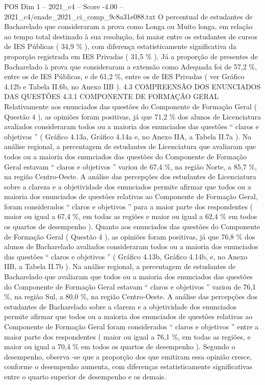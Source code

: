 \begin{textsample}{POS Dim 1 – 2021\_c4 – Score -4.00 – 2021\_c4/enade\_2021\_ci\_comp\_9c8a31e088.txt}
O percentual de estudantes de Bacharelado que consideraram a prova como Longa ou Muito longa, em relação ao tempo total destinado à sua resolução, foi maior entre os estudantes de cursos de IES Públicas ( 34,9 \% ), com diferença estatisticamente significativa da proporção registrada em IES Privadas ( 31,5 \% ).
Já a proporção de presentes de Bacharelado à prova que consideraram a extensão como Adequada foi de 57,2 \%, entre os de IES Públicas, e de 61,2 \%, entre os de IES Privadas ( ver Gráfico 4.12b e Tabela II.6b, no Anexo IIB ). 4.3 COMPREENSÃO DOS ENUNCIADOS DAS QUESTÕES 4.3.1 COMPONENTE DE FORMAÇÃO GERAL Relativamente aos enunciados das questões do Componente de Formação Geral ( Questão 4 ), as opiniões foram positivas, já que 71,2 \% dos alunos de Licenciatura avaliados consideraram todos ou a maioria dos enunciados das questões “ claros e objetivos ” ( Gráfico 4.13a, Gráfico 4.14a e, no Anexo IIA, a Tabela II.7a ).
Na análise regional, a percentagem de estudantes de Licenciatura que avaliaram que todos ou a maioria dos enunciados das questões do Componente de Formação Geral estavam “ claros e objetivos ” variou de 67,4 \%, na região Norte, a 85,7 \%, na região Centro-Oeste.
A análise das percepções dos estudantes de Licenciatura sobre a clareza e a objetividade dos enunciados permite afirmar que todos ou a maioria dos enunciados de questões relativas ao Componente de Formação Geral, foram considerados “ claros e objetivos ” para a maior parte dos respondentes ( maior ou igual a 67,4 \%, em todas as regiões e maior ou igual a 62,4 \% em todos os quartos de desempenho ).
Quanto aos enunciados das questões do Componente de Formação Geral ( Questão 4 ), as opiniões foram positivas, já que 76,8 \% dos alunos de Bacharelado avaliados consideraram todos ou a maioria dos enunciados das questões “ claros e objetivos ” ( Gráfico 4.13b, Gráfico 4.14b, e, no Anexo IIB, a Tabela II.7b ).
Na análise regional, a percentagem de estudantes de Bacharelado que avaliaram que todos ou a maioria dos enunciados das questões do Componente de Formação Geral estavam “ claros e objetivos ” variou de 76,1 \%, na região Sul, a 80,0 \%, na região Centro-Oeste.
A análise das percepções dos estudantes de Bacharelado sobre a clareza e a objetividade dos enunciados permite afirmar que todos ou a maioria dos enunciados de questões relativas ao Componente de Formação Geral foram considerados “ claros e objetivos ” entre a maior parte dos respondentes ( maior ou igual a 76,1 \%, em todas as regiões, e maior ou igual a 70,4 \% em todos os quartos de desempenho ).
Segundo o desempenho, observa -se que a proporção dos que emitiram essa opinião cresce, conforme o desempenho aumenta, com diferenças estatisticamente significativas entre o quarto superior de desempenho e os demais.

\end{textsample}
